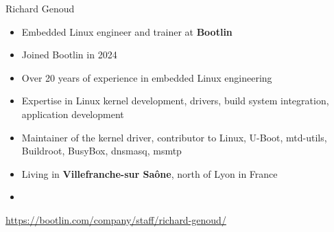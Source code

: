\begin{frame}{Richard Genoud}
  \begin{itemize}
  \item Embedded Linux engineer and trainer at {\bf Bootlin}
  \item Joined Bootlin in 2024
  \item Over 20 years of experience in embedded Linux engineering
  \item Expertise in Linux kernel development, drivers, build system
    integration, application development
  \item Maintainer of the  kernel driver,
    contributor to Linux, U-Boot, mtd-utils, Buildroot, BusyBox,
    dnsmasq, msmtp
  \item Living in {\bf Villefranche-sur Saône}, north of Lyon in France
  \item {}
  \end{itemize}
  {\small \url{https://bootlin.com/company/staff/richard-genoud/}}
\end{frame}
